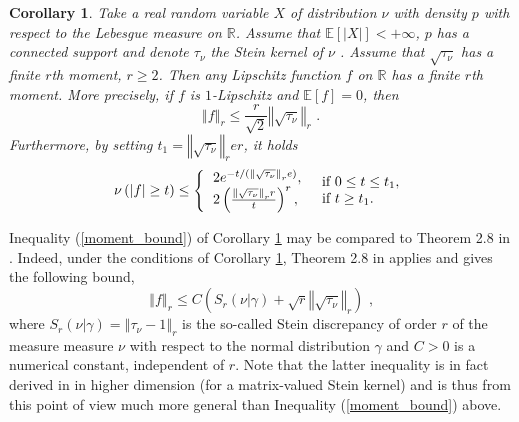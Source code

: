 \documentclass[11pt]{article}
\newtheorem{corollary}[theorem]{Corollary}
\begin{document}
\begin{corollary}
\label{cor_poin_concen}Take a real random variable $X$ of distribution $\nu $
with density $p$ with respect to the Lebesgue measure on $\mathbb{R}$.
Assume that $\mathbb{E}\left[ \left\vert X\right\vert \right] <+\infty $, $p$
has a connected support and denote $\tau _{\nu }$ the Stein kernel of $\nu $%
. Assume that $\sqrt{\tau _{\nu }}$ has a finite $r$th moment, $r\geq 2$.
Then any Lipschitz function $f$ on $\mathbb{R}$ has a finite $r$th moment.
More precisely, if $f$ is $1$-Lipschitz and $\mathbb{E}\left[ f\right] =0$,
then%
\begin{equation}
\left\Vert f\right\Vert _{r}\leq \frac{r}{\sqrt{2}}\left\Vert \sqrt{\tau
_{\nu }}\right\Vert _{r}\text{ .}  \label{moment_bound}
\end{equation}%
Furthermore, by setting $t_{1}=\left\Vert \sqrt{\tau _{\nu }}\right\Vert
_{r}er$, it holds%
\begin{equation*}
\nu \left( \left\vert f\right\vert \geq t\right) \leq \left\{ 
\begin{tabular}{l}
$2e^{-t/(\left\Vert \sqrt{\tau _{\nu }}\right\Vert _{r}e)},$ \\ 
$2\left( \frac{\left\Vert \sqrt{\tau _{\nu }}\right\Vert _{r}r}{t}\right)
^{r},$%
\end{tabular}%
\right. 
\begin{tabular}{l}
if $0\leq t\leq t_{1},$ \\ 
if $t\geq t_{1}.$%
\end{tabular}%
\end{equation*}
\end{corollary}

Inequality (\ref{moment_bound}) of Corollary \ref{cor_poin_concen} may be
compared to Theorem 2.8 in \cite{LedoucNourdinPeccati:15}. Indeed, under the
conditions of Corollary \ref{cor_poin_concen}, Theorem 2.8 in \cite%
{LedoucNourdinPeccati:15} applies and gives the following bound,%
\begin{equation}
\left\Vert f\right\Vert _{r}\leq C\left( S_{r}\left( \nu \left\vert \gamma
\right. \right) +\sqrt{r}\left\Vert \sqrt{\tau _{\nu }}\right\Vert
_{r}\right) \text{ ,}  \label{ineq_LNP}
\end{equation}%
where $S_{r}\left( \nu \left\vert \gamma \right. \right) =\left\Vert \tau
_{\nu }-1\right\Vert _{r}$ is the so-called Stein discrepancy of order $r$
of the measure measure $\nu $ with respect to the normal distribution $%
\gamma $ and $C>0$ is a numerical constant, independent of $r$. Note that
the latter inequality is in fact derived in \cite{LedoucNourdinPeccati:15}
in higher dimension (for a matrix-valued Stein kernel) and is thus from this
point of view much more general than Inequality (\ref{moment_bound}) above.
\end{document}
